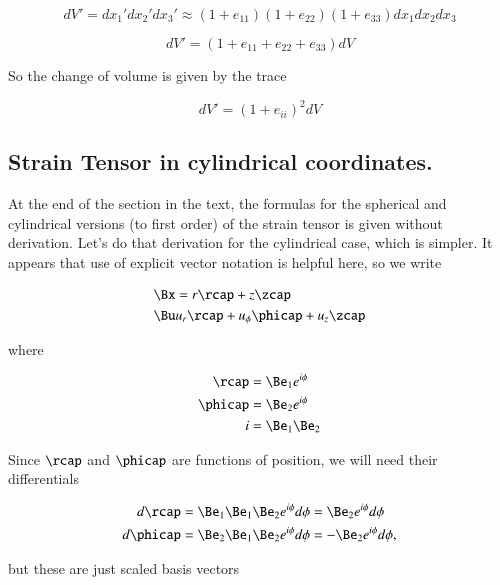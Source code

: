 \begin{equation}\label{eqn:continuumL2:310}
dV' = 
dx_1'
dx_2'
dx_3'
\approx
(1 + e_{11})
(1 + e_{22})
(1 + e_{33})
dx_1 dx_2 dx_3
\end{equation}

\begin{equation}\label{eqn:continuumL2:330}
dV' = (1 + e_{11} +e_{22} +e_{33} ) dV
\end{equation}

So the change of volume is given by the trace

\begin{equation}\label{eqn:continuumL2:350}
dV' = ( 1 + e_{ii} )^2 dV
\end{equation}

\subsection{Strain Tensor in cylindrical coordinates.}

At the end of the section in the text, the formulas for the spherical and cylindrical versions (to first order) of the strain tensor is given without derivation.  Let's do that derivation for the cylindrical case, which is simpler.  It appears that use of explicit vector notation is helpful here, so we write

\begin{align}\label{eqn:continuumL2:370}
\Bx &= r \rcap + z \zcap \\
\Bu & u_r \rcap + u_\phi \phicap + u_z \zcap
\end{align}

where

\begin{align}\label{eqn:continuumL2:390}
\rcap &= \Be_1 e^{i\phi} \\
\phicap &= \Be_2 e^{i\phi} \\
i &= \Be_1 \Be_2
\end{align}

Since $\rcap$ and $\phicap$ are functions of position, we will need their differentials

\begin{align}\label{eqn:continuumL2:410}
d\rcap &= \Be_1 \Be_1 \Be_2 e^{i\phi} d\phi = \Be_2 e^{i \phi} d\phi \\
d\phicap &= \Be_2 \Be_1 \Be_2 e^{i\phi} d\phi = -\Be_2 e^{i \phi} d\phi,
\end{align}

but these are just scaled basis vectors

